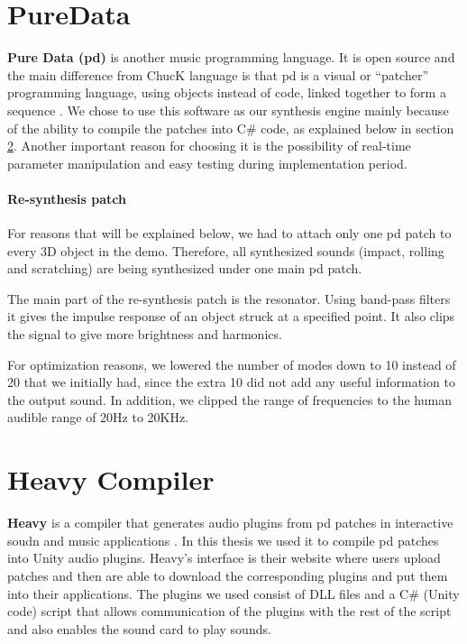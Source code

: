 \section{PureData}
\textbf{Pure Data (pd)} is another music programming language. It is open source and the main difference from ChucK language is that pd is a visual or ``patcher'' programming language, using objects instead of code, linked together to form a sequence \cite{bib:pd}. We chose to use this software as our synthesis engine mainly because of the ability to compile the patches into C\# code, as explained below in section \ref{sec:heavy}. Another important reason for choosing it is the possibility of real-time parameter manipulation and easy testing during implementation period.

\paragraph{Re-synthesis patch\\}
For reasons that will be explained below, we had to attach only one pd patch to every 3D object in the demo. Therefore, all synthesized sounds (impact, rolling and scratching) are being synthesized under one main pd patch. 

The main part of the re-synthesis patch is the resonator. Using band-pass filters it gives the impulse response of an object struck at a specified point. It also clips the signal to give more brightness and harmonics. 

For optimization reasons, we lowered the number of modes down to 10 instead of 20 that we initially had, since the extra 10 did not add any useful information to the output sound. In addition, we clipped the range of frequencies to the human audible range of 20Hz to 20KHz. 

\section{Heavy Compiler}\label{sec:heavy}
\textbf{Heavy} is a compiler that generates audio plugins from pd patches in interactive soudn and music applications \cite{bib:heavy}. In this thesis we used it to compile pd patches into Unity audio plugins. Heavy's interface is their website where users upload patches and then are able to download the corresponding plugins and put them into their applications. The plugins we used consist of DLL files and a C\# (Unity code) script that allows communication of the plugins with the rest of the script and also enables the sound card to play sounds.

